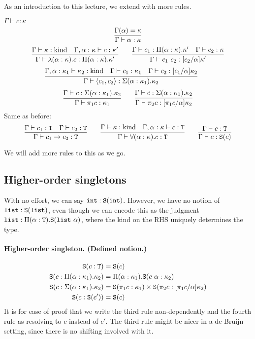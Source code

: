 
As an introduction to this lecture, we extend  with more rules.
\begin{judgment}
  $\Gamma \vdash c : \kappa$
  \[
    \infer{\Gamma \vdash \alpha : \kappa}{\Gamma(\alpha) = \kappa}
  \]
  \[
    \infer{\Gamma \vdash \lambda(\alpha : \kappa).c : \Pi(\alpha : \kappa).\kappa'}
      {\Gamma \vdash \kappa : \kind
      &\Gamma, \alpha : \kappa \vdash c : \kappa'
      }
    \qquad
    \infer{\Gamma \vdash c_1~c_2 : [c_2 / \alpha]\kappa'}
      {\Gamma \vdash c_1 : \Pi(\alpha:\kappa).\kappa'
      &\Gamma \vdash c_2 : \kappa
      }
  \]
  \[
    \infer{\Gamma \vdash \langle c_1, c_2 \rangle : \Sigma(\alpha : \kappa_1).\kappa_2}
      {\Gamma, \alpha : \kappa_1 \vdash \kappa_2 : \kind
      &\Gamma \vdash c_1 : \kappa_1
      &\Gamma \vdash c_2 : [c_1/\alpha]\kappa_2
      }
    \qquad
  \]
  \[
    \infer{\Gamma \vdash \pi_1c : \kappa_1}
      {\Gamma \vdash c : \Sigma (\alpha : \kappa_1).\kappa_2}
    \qquad
    \infer{\Gamma \vdash \pi_2c : [\pi_1c/\alpha]\kappa_2}
      {\Gamma \vdash c : \Sigma (\alpha : \kappa_1).\kappa_2}
  \]
Same as before:
  \[
    \infer{\Gamma \vdash c_1 \to c_2 : \T}{\Gamma \vdash c_1 : \T & \Gamma \vdash c_2 : \T}
    \qquad
    \infer{\Gamma \vdash \forall(\alpha:\kappa).c : \T}
      {\Gamma \vdash \kappa : \kind
      &\Gamma, \alpha : \kappa \vdash c : \T
      }
    \qquad
    \infer{\Gamma \vdash c : \S(c)}
      {\Gamma \vdash c : \T}
  \]
\end{judgment}
We will add more rules to this as we go.

\subsection{Higher-order singletons}
With no effort, we can say $\int : \S(\int)$. However, we have no notion
of $\lst : \S(\lst)$, even though we can encode this as the judgment
$\lst : \Pi(\alpha : \T). \S(\lst~\alpha)$, where the kind on the RHS
uniquely determines the type.

\paragraph{Higher-order singleton. (Defined notion.)}
\begin{align*}
  \S(c : \T) &= \S(c)\\
  \S(c : \Pi(\alpha : \kappa_1).\kappa_2) &= \Pi(\alpha : \kappa_1).\S(c~\alpha : \kappa_2)\\
  \S(c : \Sigma(\alpha : \kappa_1).\kappa_2) &=
    \S(\pi_1c : \kappa_1) \times \S(\pi_2c : [\pi_1c/\alpha]\kappa_2)\\
  \S(c : \S(c')) &= \S(c)
\end{align*}
It is for ease of proof that we write the third rule non-dependently and the
fourth rule as resolving to $c$ instead of $c'$. The third rule might be nicer in a
de Bruijn setting, since there is no shifting involved with it.


